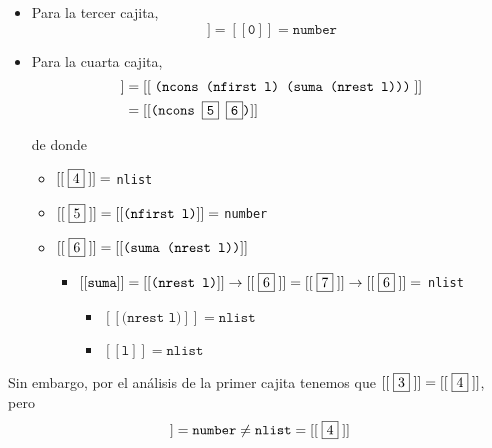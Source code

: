 \documentclass[letterpaper,11pt]{article}
\begin{document}
\begin{enumerate}
\begin{enumerate}
\begin{itemize}
            \item Para la tercer cajita,
            \begin{equation*}
                [[\; \fbox{3} \;]] 
                = [[\texttt{0} ]]
                = \texttt{number}
            \end{equation*}

            \item Para la cuarta cajita, 
            \begin{align*}
                [[\; \fbox{4} \;]]
                &= [[\; \texttt{(ncons (nfirst l) (suma (nrest l)))} \;]] \\ 
                &= [[\texttt{(ncons \fbox{5} \fbox{6})}]]
            \end{align*}

            de donde 
            \begin{itemize}
                \item $[[\; \fbox{4} \;]] =$ \texttt{nlist}
                \item $[[\; \fbox{5} \;]] = [[\texttt{(nfirst l)}]] =$
                \texttt{number}

                \item $[[\; \fbox{6} \;]] = [[\texttt{(suma (nrest l))}]]$
                \begin{itemize}
                    \item $[[\texttt{suma}]] = [[\texttt{(nrest l)}]] 
                    \rightarrow [[\;\fbox{6}\;]] = [[\;\fbox{7}\;]] 
                    \rightarrow [[\;\fbox{6}\;]] = $ \texttt{nlist}
                    \begin{itemize}
                        \item $[[\texttt{(nrest l)}]] = \texttt{nlist}$
                        \item $[[\texttt{l}]] = \texttt{nlist}$
                    \end{itemize}
                \end{itemize}
            \end{itemize}
        \end{itemize}

        Sin embargo, por el análisis de la primer cajita tenemos que 
        $[[\; \fbox{3} \;]] = [[\; \fbox{4} \;]]$, pero 
        \begin{equation*}
            [[\; \fbox{3} \;]] = \texttt{number} \neq 
            \texttt{nlist} = [[\; \fbox{4} \;]]
        \end{equation*}


\end{enumerate}
\end{enumerate}
\end{document}
